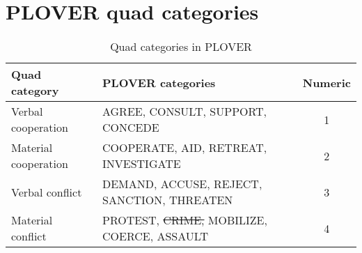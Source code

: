 \documentclass[11pt]{report}
\begin{document}
\section{PLOVER quad categories}

\begin{table}[htp]
\caption{Quad categories in PLOVER}
\begin{center}
\begin{tabular}{|l|l|c|}
\hline
Quad category & PLOVER categories & Numeric\\
\hline
Verbal cooperation & AGREE, CONSULT, SUPPORT, CONCEDE &  1 \\
Material cooperation & COOPERATE, AID, RETREAT, INVESTIGATE & 2 \\
Verbal conflict & DEMAND, ACCUSE, REJECT, SANCTION, THREATEN & 3\\
Material conflict & PROTEST, \sout{CRIME,} MOBILIZE, COERCE, ASSAULT & 4\\
\hline

\end{tabular}
\end{center}
\label{default}
\end{table}







\end{document}
